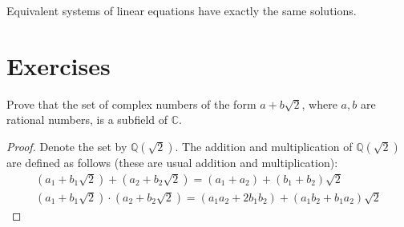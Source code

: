 \begin{theorem}
	Equivalent systems of linear equations have exactly the same solutions.
\end{theorem}

\section*{Exercises}

\begin{exercise}
	Prove that the set of complex numbers of the form $a + b\sqrt{2}$, where $a, b$ are rational numbers, is a subfield of $\mathbb{C}$.
\end{exercise}

\begin{proof}
	Denote the set by $\mathbb{Q}(\sqrt{2})$. The addition and multiplication of $\mathbb{Q}(\sqrt{2})$ are defined as follows (these are usual addition and multiplication):
	\[
		\begin{split}
			(a_{1} + b_{1}\sqrt{2}) + (a_{2} + b_{2}\sqrt{2}) = (a_{1} + a_{2}) + (b_{1} + b_{2})\sqrt{2} \\
			(a_{1} + b_{1}\sqrt{2}) \cdot (a_{2} + b_{2}\sqrt{2}) = (a_{1}a_{2} + 2b_{1}b_{2}) + (a_{1}b_{2} + b_{1}a_{2})\sqrt{2}
		\end{split}
	\]


\end{proof}
